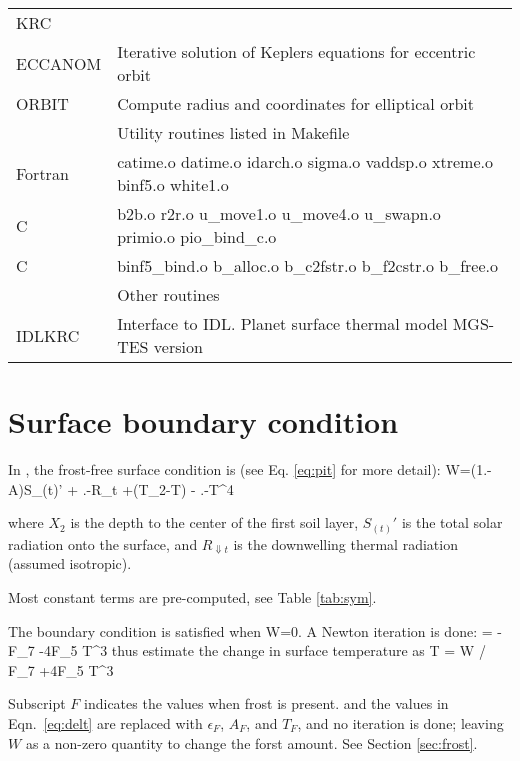 \documentclass{article}
\begin{document}
\begin{table}
\begin{center}
\begin{tabular}{ l l}
KRC \\
ECCANOM &  Iterative solution of Keplers equations for eccentric orbit \\
ORBIT &  Compute radius and coordinates for elliptical orbit \\
 & \hcm3 Utility routines listed in Makefile \hcm3\\
Fortran & catime.o datime.o idarch.o sigma.o vaddsp.o xtreme.o binf5.o white1.o \\
C &  b2b.o r2r.o u\_move1.o u\_move4.o u\_swapn.o primio.o pio\_bind\_c.o \\
C &  binf5\_bind.o b\_alloc.o b\_c2fstr.o b\_f2cstr.o b\_free.o \\
 & \hcm3 Other routines \hcm3\\
IDLKRC  &  Interface to IDL. Planet surface thermal model  MGS-TES version \\
\end{tabular} \end{center}
\end{table}


\section{Surface boundary condition} %
In , the frost-free surface condition is (see Eq. \ref{eq:pit} for
more detail):
\qbn W=(1.-A)S_{(t)}'  + .-\alpha \qr \epsilon R_{\Downarrow t}
+(T_2-T) - .-\alpha \qr \epsilon\sigma T^4 \qen

where $X_2$ is the depth to the center of the first soil layer, $S_{(t)}'$ is
the total solar radiation onto the surface, and $ R_{\Downarrow t}$ is the
downwelling thermal radiation (assumed isotropic).

Most constant terms are pre-computed, see Table \ref{tab:sym}.

The boundary condition is satisfied when W=0. A Newton iteration is done:
\qb {} = -F_7 -4F_5 T^3 \qe
thus estimate the change in surface temperature as 
\qbn \Delta T = W / \ql F_7 +4F_5 T^3\qr \label{eq:delt} \qen


Subscript $F$ indicates the values when frost is present. and the values in
Eqn.~\ref{eq:delt} are replaced with $\epsilon_F$, $A_F$, and $T_F$, and no
iteration is done; leaving $W$ as a non-zero quantity to change the forst
amount. See Section \ref{sec:frost}.

\end{document}
